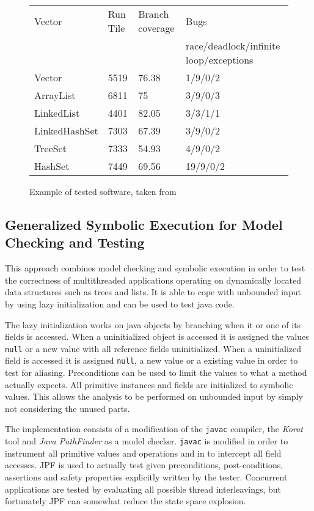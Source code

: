 \documentclass[10pt]{llncs}
\begin{document}
\begin{figure}
	\centering
	
	\begin{tabular}{l l l l}
		Vector & Run Tile & Branch coverage & Bugs \\
		 & & & race/deadlock/infinite loop/exceptions \\
		 
		\hline
		
		Vector & 5519 & 76.38 & 1/9/0/2 \\
		ArrayList & 6811 & 75 & 3/9/0/3 \\
		LinkedList & 4401 & 82.05 & 3/3/1/1 \\
		LinkedHashSet & 7303 & 67.39 & 3/9/0/2 \\
		TreeSet & 7333 & 54.93 & 4/9/0/2 \\
		HashSet & 7449 & 69.56 & 19/9/0/2 \\
	\end{tabular}
	
	\caption{Example of tested software, taken from \cite{base4}}
	\label{example:4}
\end{figure}

\subsection{Generalized Symbolic Execution for Model Checking and Testing \cite{base5}}

This approach combines model checking and symbolic execution in order to test the correctness of multithreaded applications operating on dynamically located data structures such as trees and lists. It is able to cope with unbounded input by using lazy initialization and can be used to test java code.

The lazy initialization works on java objects by branching when it or one of its fields is accessed. When a uninitialized object is accessed it is assigned the values \texttt{null} or a new value with all reference fields uninitialized. When a uninitialized field is accessed it is assigned \texttt{null}, a new value or a existing value in order to test for aliasing. Preconditions can be used to limit the values to what a method actually expects. All primitive instances and fields are initialized to symbolic values. This allows the analysis to be performed on unbounded input by simply not considering the unused parts.

The implementation consists of a modification of the \texttt{javac} compiler, the \emph{Korat} tool \cite{korat} and \emph{Java PathFinder} \cite{pathfinder} as a model checker. \texttt{javac} is modified in order to instrument all primitive values and operations and in to intercept all field accesses. JPF is used to actually test given preconditions, post-conditions, assertions and safety properties explicitly written by the tester. Concurrent applications are tested by evaluating all possible thread interleavings, but fortunately JPF can somewhat reduce the state space explosion.
\end{document}
